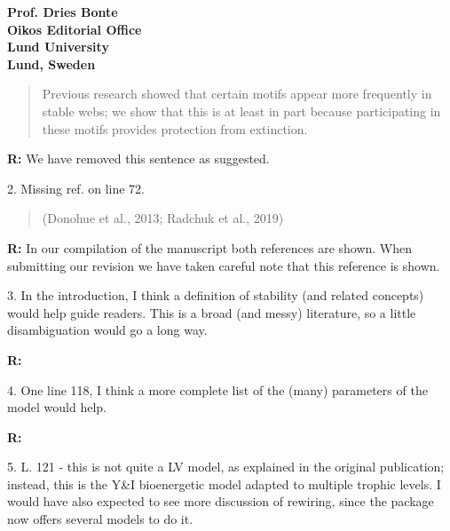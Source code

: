 \documentclass[12pt]{letter}
\begin{document}
\begin{letter}{\bf Prof. Dries Bonte\\
Oikos Editorial Office \\
Lund University \\
Lund, Sweden}
    \begin{quotation}
      Previous research showed that certain motifs appear more frequently in stable webs; we show that this is at least in part because participating in these motifs provides protection from extinction.
    \end{quotation}

    \smallskip

    \textbf{R:} We have removed this sentence as suggested.

    \smallskip

    2. Missing ref. on line 72.

    \begin{quotation}
    (Donohue et al., 2013; Radchuk et al., 2019)
    \end{quotation}

    \smallskip

    \textbf{R:} In our compilation of the manuscript both references are shown. When submitting our revision we have taken careful note that this reference is shown.

    \smallskip

    3. In the introduction, I think a definition of stability (and related concepts) would help guide readers. This is a broad (and messy) literature, so a little disambiguation would go a long way.

    \smallskip

    \textbf{R:} %

    \smallskip

    4. One line 118, I think a more complete list of the (many) parameters of the model would help.


    \smallskip

    \textbf{R:}

    \smallskip

    5. L. 121 - this is not quite a LV model, as explained in the original publication; instead, this is the Y\&I bioenergetic model adapted to multiple trophic levels. I would have also expected to see more discussion of rewiring, since the package now offers several models to do it.


\end{letter}
\end{document}
